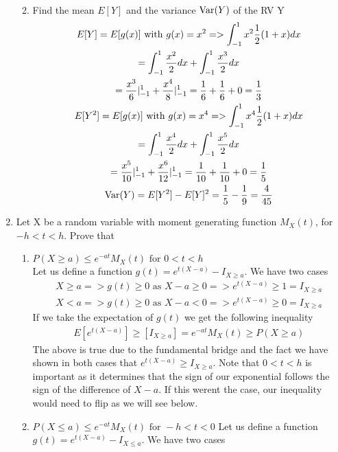 \documentclass[11pt]{article}
\newcommand{\var}{\mathop{\rm Var}}
\begin{document}
\begin{enumerate}
\begin{enumerate}
\begin{gather}
	\end{gather}
	\item Find the mean $E[Y]$ and the variance $\var(Y)$ of the RV Y
	\begin{gather}
	E[Y]= E[g(x)] \text{ with } g(x) = x^2 => \int_{-1}^{1}x^2\frac{1}{2}(1+x)dx\\
	= \int_{-1}^{1}\frac{x^2}{2}dx + \int_{-1}^{1}\frac{x^3}{2}dx \\
	= \frac{x^3}{6}|_{-1}^{1} +  \frac{x^4}{8}|_{-1}^{1} = \frac{1}{6} + \frac{1}{6} + 0 = \frac{1}{3}\\
	E[Y^2] = E[g(x)] \text{ with } g(x) = x^4  => \int_{-1}^{1}x^4\frac{1}{2}(1+x)dx\\
	= \int_{-1}^{1}\frac{x^4}{2}dx + \int_{-1}^{1}\frac{x^5}{2}dx \\
	= \frac{x^5}{10}|_{-1}^{1} +  \frac{x^6}{12}|_{-1}^{1} = \frac{1}{10} + \frac{1}{10} + 0 = \frac{1}{5}\\
	\var(Y) = E[Y^2]-E[Y]^2 = \frac{1}{5} - \frac{1}{9} = \frac{4}{45}
	\end{gather}
\end{enumerate}
\item Let X be a random variable with moment generating function $M_X(t)$, for $-h<t<h$. Prove that
\begin{enumerate}
	\item $P(X\ge a) \le e^{-at}M_X(t) \text{ for } 0<t<h$\\
	Let us define a function $g(t) = e^{t(X-a)} - I_{X\ge a}$. We have two cases
	\begin{gather}
		X\ge a=> g(t)\ge 0 \text{ as } X-a \ge 0 => e^{t(X-a)} \ge 1 = I_{X\ge a}\\
		X < a=> g(t)\ge 0 \text{ as } X-a < 0 => e^{t(X-a)} \ge 0 = I_{X\ge a}
	\end{gather}
	If we take the expectation of $g(t)$ we get the following inequality\\
	\begin{gather}
		E[e^{t(X-a)}] \ge [I_{X\ge a}] = e^{-at}M_X(t) \ge P(X\ge a)
	\end{gather}
	The above is true due to the fundamental bridge and the fact we have shown in both cases that $e^{t(X-a)} \ge I_{X\ge a}$. Note that $0<t<h$ is important as it determines that the sign of our exponential follows the sign of the difference of $X-a$. If this werent the case, our inequality would need to flip as we will see below.
	\item $P(X\le a) \le e^{-at}M_X(t) \text{ for } -h<t<0$
	Let us define a function $g(t) = e^{t(X-a)} - I_{X\le a}$. We have two cases

\end{enumerate}
\end{enumerate}
\end{document}
